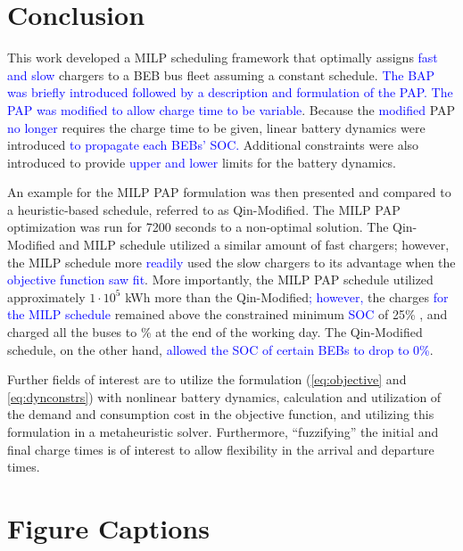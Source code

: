 \documentclass[utf8]{FrontiersinHarvard}
\newcommand{\bcharge}{0.7 }                                                     %
\newcommand{\mincharge}{25\% }                                                  %
\newcommand{\timeran}{7200 }                                                    %
\begin{document}
\section{Conclusion}
\label{sec:conclusion}
This work developed a MILP scheduling framework that optimally assigns \textcolor{blue}{fast and slow} chargers to a BEB
bus fleet assuming a constant schedule. \textcolor{blue}{The BAP was briefly introduced followed by a description and formulation of the PAP.} \textcolor{blue}{The PAP was modified to allow charge time to be variable}. Because the
\textcolor{blue}{modified} PAP \textcolor{blue}{no longer} requires the charge time to be given, linear battery dynamics
were introduced \textcolor{blue}{to propagate each BEBs' SOC.} Additional constraints were also introduced to provide
\textcolor{blue}{upper and lower} limits for the battery dynamics.

An example for the MILP PAP formulation was then presented and compared to a heuristic-based schedule, referred to as
Qin-Modified. The MILP PAP optimization was run for \timeran seconds to a non-optimal solution. The Qin-Modified and
MILP schedule utilized a similar amount of fast chargers; however, the MILP schedule more
\textcolor{blue}{readily} used the slow chargers to its advantage when the
\textcolor{blue}{objective function saw fit}. More importantly, the MILP PAP schedule utilized approximately
\(1\cdot10^5\) kWh more than the Qin-Modified\textcolor{blue}{; however,} the charges \textcolor{blue}{for the MILP schedule} remained above the constrained minimum \textcolor{blue}{SOC} of \mincharge, and charged all the
buses to \fpeval{\bcharge *100}\% at the end of the working day. The Qin-Modified schedule, on the other hand,
\textcolor{blue}{allowed the SOC of certain BEBs to drop to 0\%}.

Further fields of interest are to utilize the formulation (\autoref{eq:objective} and \autoref{eq:dynconstrs}) with
nonlinear battery dynamics, calculation and utilization of the demand and consumption cost in the objective function,
and utilizing this formulation in a metaheuristic solver. Furthermore, ``fuzzifying'' the initial and final charge times
is of interest to allow flexibility in the arrival and departure times.




\nolinenumbers
\clearpage

\section{Figure Captions}
\label{sec:org0ee98f4}
\end{document}
